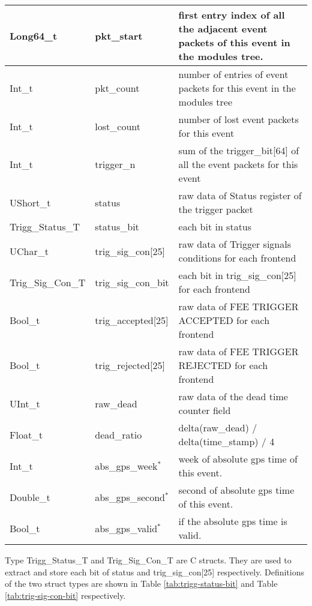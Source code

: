 \documentclass[a4paper, 12pt, onecolumn]{article}
\begin{document}
\begin{center}
\begin{supertabular}{| p{28mm} | p{29mm} | p{66mm} |}
    Long64\_t          & pkt\_start           & first entry index of all the adjacent event packets of this event in the modules tree. \\\hline
    Int\_t             & pkt\_count           & number of entries of event packets for this event in the modules tree \\\hline
    Int\_t             & lost\_count          & number of lost event packets for this event \\\hline
    Int\_t             & trigger\_n           & sum of the trigger\_bit[64] of all the event packets for this event \\\hline
    UShort\_t          & status               & raw data of Status register of the trigger packet \\\hline
    Trigg\_Status\_T   & status\_bit          & each bit in status \\\hline
    UChar\_t           & trig\_sig\_con[25]   & raw data of Trigger signals conditions for each frontend \\\hline
    Trig\_Sig\_Con\_T  & trig\_sig\_con\_bit  & each bit in trig\_sig\_con[25] for each frontend \\\hline
    Bool\_t            & trig\_accepted[25]   & raw data of FEE TRIGGER ACCEPTED for each frontend \\\hline
    Bool\_t            & trig\_rejected[25]   & raw data of FEE TRIGGER REJECTED for each frontend \\\hline
    UInt\_t            & raw\_dead            & raw data of the dead time counter field \\\hline
    Float\_t           & dead\_ratio          & delta(raw\_dead) / delta(time\_stamp) / 4 \\\hline
    Int\_t             & abs\_gps\_week$^*$   & week of absolute gps time of this event. \\\hline
    Double\_t          & abs\_gps\_second$^*$ & second of absolute gps time of this event. \\\hline
    Bool\_t            & abs\_gps\_valid$^*$  & if the absolute gps time is valid. \\
  \end{supertabular}
\end{center}

Type Trigg\_Status\_T and Trig\_Sig\_Con\_T are C structs. They are used to extract and store each bit of status and trig\_sig\_con[25] respectively.
Definitions of the two struct types are shown in Table \ref{tab:trigg-status-bit} and Table \ref{tab:trig-sig-con-bit} respectively.
\end{document}
